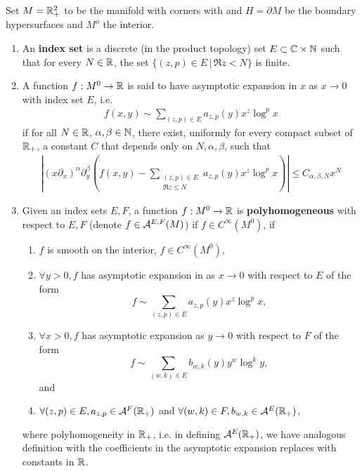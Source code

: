 \documentclass{article}
\begin{document}
\begin{fdefinition}
Set $M = {\mathbb R}_+^2$ to be the manifold with corners with and $H = \partial M$ be the boundary hypersurfaces and $M^o$ the interior. 
\begin{enumerate}
\item An \textbf{index set} is a discrete (in the product topology) set $E \subset {\ensuremath {\mathbb C}} \times {\ensuremath {\mathbb N}}$ such that for every $N \in {\ensuremath {\mathbb R}}$, the set $\{(z, p) \in E \, |\, \Re z < N\}$ is finite. 
\item A function $f: M^0 \to {\ensuremath {\mathbb R}}$ is said to have asymptotic expansion in $x$ as $x \to 0$ with index set $E$, i.e. 
\begin{align*}
f(x, y) \sim \sum_{(z, p) \in E} a_{z, p}(y) x^z \log^p x
\end{align*}
if for all $N \in {\ensuremath {\mathbb R}}$, $\alpha, \beta \in {\ensuremath {\mathbb N}}$, there exist, uniformly for every compact subset of ${\mathbb R}_+$, a constant $C$ that depends only on $N, \alpha, \beta$, such that 
\begin{align*}
\left | (x\partial_x)^\alpha \partial_y^\beta \left( f(x, y) -  \sum_{\substack{(z, p) \in E \\ \Re z \leq N}} a_{z, p}(y) x^z \log^p x \right ) \right | \leq C_{\alpha, \beta, N} x^N
\end{align*}
\item Given an index sets $E, F$, a function $f: M^0 \to {\ensuremath {\mathbb R}}$ is \textbf{polyhomogeneous} with respect to $E, F$ (denote $f \in {{\ensuremath {\cal A}}}^{E, F}(M)$) if $f \in C^\infty(M^0)$, if 
\begin{enumerate}
\item $f$ is smooth on the interior, $f \in C^\infty(M^0)$, 
\item $\forall y > 0, f$ has asymptotic expansion in as $x \to 0$ with respect to $E$ of the form  $$f \sim \sum_{(z, p) \in E} a_{z, p}(y) x^z \log^p x, $$ 
\item $\forall x > 0, f$ has asymptotic expansion as $y \to 0$ with respect to $F$ of the form  $$f \sim \sum_{(w, k) \in E} b_{w, k}(y) y^w \log^k y,$$ and
\item $\forall (z, p) \in E, a_{z, p} \in {\ensuremath {\cal A}}^F({\mathbb R}_+)$ and $\forall (w, k) \in F, b_{w, k} \in {\ensuremath {\cal A}}^E({\mathbb R}_+)$,
\end{enumerate}
where polyhomogeneity in ${\mathbb R}_+$, i.e. in defining ${\cal A}^E({\mathbb R}_+)$, we have analogous definition with the coefficients in the asymptotic expansion replaces with constants in ${\mathbb R}$. 
\end{enumerate}
\end{fdefinition}
\end{document}
